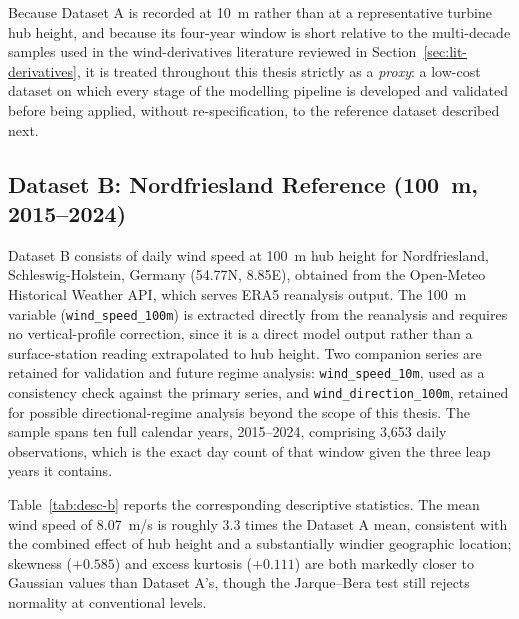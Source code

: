 ﻿\documentclass[11pt, a4paper, twoside]{article}
\begin{document}
Because Dataset A is recorded at 10~m rather than at a representative turbine hub height, and because its four-year window is short relative to the multi-decade samples used in the wind-derivatives literature reviewed in Section~\ref{sec:lit-derivatives}, it is treated throughout this thesis strictly as a \emph{proxy}: a low-cost dataset on which every stage of the modelling pipeline is developed and validated before being applied, without re-specification, to the reference dataset described next.

\subsection{Dataset B: Nordfriesland Reference (100~m, 2015--2024)}
\label{sec:data-b}

Dataset B consists of daily wind speed at 100~m hub height for Nordfriesland, Schleswig-Holstein, Germany (54.77\textdegree{}N, 8.85\textdegree{}E), obtained from the Open-Meteo Historical Weather API, which serves ERA5 reanalysis output. The 100~m variable (\texttt{wind\_speed\_100m}) is extracted directly from the reanalysis and requires no vertical-profile correction, since it is a direct model output rather than a surface-station reading extrapolated to hub height. Two companion series are retained for validation and future regime analysis: \texttt{wind\_speed\_10m}, used as a consistency check against the primary series, and \texttt{wind\_direction\_100m}, retained for possible directional-regime analysis beyond the scope of this thesis. The sample spans ten full calendar years, 2015--2024, comprising 3{,}653 daily observations, which is the exact day count of that window given the three leap years it contains.

Table~\ref{tab:desc-b} reports the corresponding descriptive statistics. The mean wind speed of 8.07~m/s is roughly 3.3 times the Dataset A mean, consistent with the combined effect of hub height and a substantially windier geographic location; skewness ($+0.585$) and excess kurtosis ($+0.111$) are both markedly closer to Gaussian values than Dataset A's, though the Jarque--Bera test still rejects normality at conventional levels.
\end{document}
